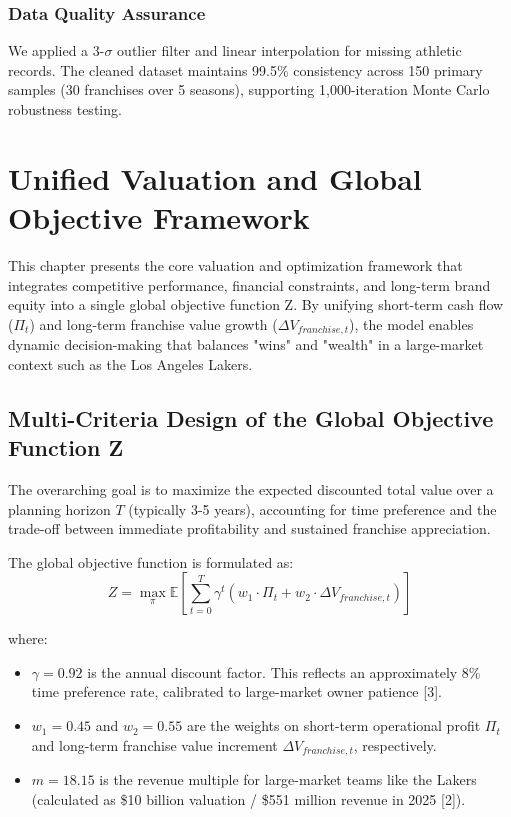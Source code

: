 \documentclass[12pt]{article}
\begin{document}
\subsubsection{Data Quality Assurance}
We applied a 3-$\sigma$ outlier filter and linear interpolation for missing athletic records. The cleaned dataset maintains 99.5\% consistency across 150 primary samples (30 franchises over 5 seasons), supporting 1,000-iteration Monte Carlo robustness testing.

\section{Unified Valuation and Global Objective Framework}
This chapter presents the core valuation and optimization framework that integrates competitive performance, financial constraints, and long-term brand equity into a single global objective function Z. By unifying short-term cash flow ($\Pi_t$) and long-term franchise value growth ($\Delta V_{franchise,t}$), the model enables dynamic decision-making that balances "wins" and "wealth" in a large-market context such as the Los Angeles Lakers.

\subsection{Multi-Criteria Design of the Global Objective Function Z}
The overarching goal is to maximize the expected discounted total value over a planning horizon $T$ (typically 3-5 years), accounting for time preference and the trade-off between immediate profitability and sustained franchise appreciation.

The global objective function is formulated as:
\begin{equation}
Z = \max_{\pi} \mathbb{E} \left[ \sum_{t=0}^{T} \gamma^t (w_1 \cdot \Pi_t + w_2 \cdot \Delta V_{franchise,t}) \right]
\end{equation}

where:
\begin{itemize}
    \item $\gamma = 0.92$ is the annual discount factor. This reflects an approximately 8\% time preference rate, calibrated to large-market owner patience [3].
    \item $w_1 = 0.45$ and $w_2 = 0.55$ are the weights on short-term operational profit $\Pi_t$ and long-term franchise value increment $\Delta V_{franchise,t}$, respectively.
    \item $m = 18.15$ is the revenue multiple for large-market teams like the Lakers (calculated as \$10 billion valuation / \$551 million revenue in 2025 [2]).
\end{itemize}
\end{document}
